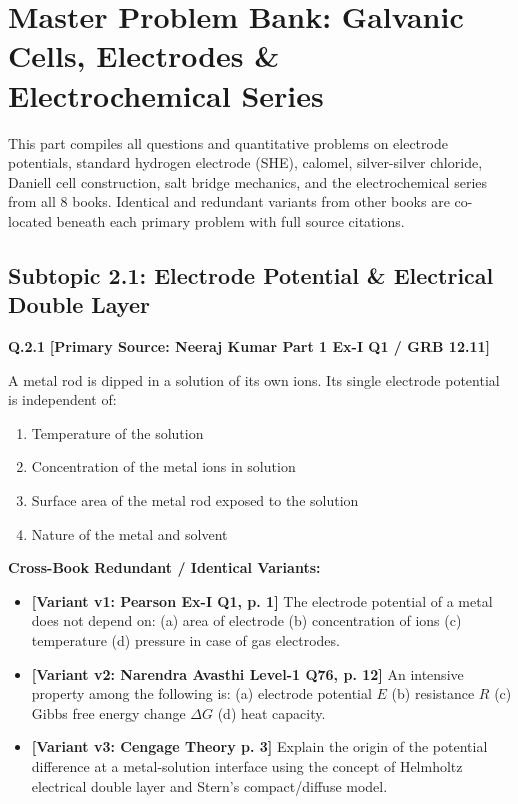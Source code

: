 \chapter{Master Problem Bank: Galvanic Cells, Electrodes \& Electrochemical Series}
\label{chap:qb_galvanic_cells}

\begin{tcolorbox}[enhanced,colback=subtleblue,colframe=primarynavy,arc=2mm,boxrule=1pt,
    title=\textbf{\large Part II Organization: Galvanic Cells, Reference Electrodes \& EC Series}]
This part compiles all questions and quantitative problems on electrode potentials, standard hydrogen electrode (SHE), calomel, silver-silver chloride, Daniell cell construction, salt bridge mechanics, and the electrochemical series from all 8 books. Identical and redundant variants from other books are co-located beneath each primary problem with full source citations.
\end{tcolorbox}

\section{Subtopic 2.1: Electrode Potential \& Electrical Double Layer}

\begin{problembox}
\textbf{Q.2.1} \hfill \textbf{[Primary Source: Neeraj Kumar Part 1 Ex-I Q1 / GRB  12.11]}
\label{q:qb-c2-01}

A metal rod is dipped in a solution of its own ions. Its single electrode potential is independent of:
\begin{enumerate}[label=(\alph*)]
    \item Temperature of the solution
    \item Concentration of the metal ions in solution
    \item Surface area of the metal rod exposed to the solution
    \item Nature of the metal and solvent
\end{enumerate}

\tcbline
\textbf{\color{accentamber}Cross-Book Redundant / Identical Variants:}
\begin{itemize}[leftmargin=*,itemsep=2pt]
    \item \textbf{[Variant v1: Pearson Ex-I Q1, p. 1]} The electrode potential of a metal does not depend on: (a) area of electrode (b) concentration of ions (c) temperature (d) pressure in case of gas electrodes.
    \item \textbf{[Variant v2: Narendra Avasthi Level-1 Q76, p. 12]} An intensive property among the following is: (a) electrode potential $E$ (b) resistance $R$ (c) Gibbs free energy change $\Delta G$ (d) heat capacity.
    \item \textbf{[Variant v3: Cengage Theory p. 3]} Explain the origin of the potential difference at a metal-solution interface using the concept of Helmholtz electrical double layer and Stern's compact/diffuse model.
\end{itemize}
\end{problembox}


